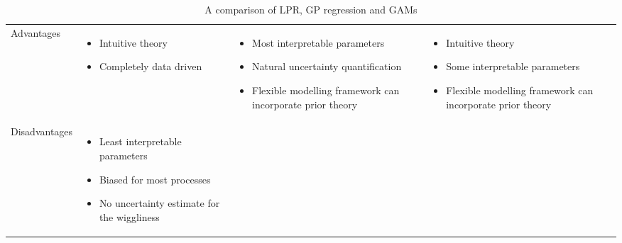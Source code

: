 \documentclass[man, floatsintext]{apa7}
\begin{document}
\begin{table}[htbp]
  \begin{center}
    \begin{threeparttable}
      \caption{A comparison of LPR, GP regression and GAMs}
      \label{tab:meth_sum}

      \begin{tabularx}{\linewidth}
        {>{\raggedright}s
          >{\raggedright}X
          >{\raggedright}X
          >{\raggedright\arraybackslash}X}
        \toprule
                                                                        &
                                                 &
                                                  &
        \\
        \midrule
        Advantages                                                      &
        \begin{itemize}
          \item Intuitive theory
          \item Completely data driven
        \end{itemize}                                    &
        \begin{itemize}
          \item Most interpretable parameters
          \item Natural uncertainty quantification
          \item Flexible modelling framework can incorporate prior theory
        \end{itemize} &
        \begin{itemize}
          \item Intuitive theory
          \item Some interpretable parameters
          \item Flexible modelling framework can incorporate prior theory
        \end{itemize}
        \\ \midrule
        Disadvantages                                                   &
        \begin{itemize}
          \item Least interpretable parameters
          \item Biased for most processes
          \item No uncertainty estimate for the wiggliness
        \end{itemize}                &

\end{tabularx}
\end{threeparttable}
\end{center}
\end{table}
\end{document}
